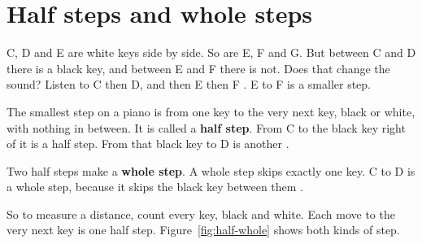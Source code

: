 \section{Half steps and whole steps}

C, D and E are white keys side by side. So are E, F and G. But between C and D there is a black key, and between E and F there is not. Does that change the sound? Listen to C then D, and then E then F . E to F is a smaller step.

The smallest step on a piano is from one key to the very next key, black or white, with nothing in between. It is called a \textbf{half step}. From C to the black key right of it is a half step. From that black key to D is another .

Two half steps make a \textbf{whole step}. A whole step skips exactly one key. C to D is a whole step, because it skips the black key between them .

So to measure a distance, count every key, black and white. Each move to the very next key is one half step. Figure~\ref{fig:half-whole} shows both kinds of step.


